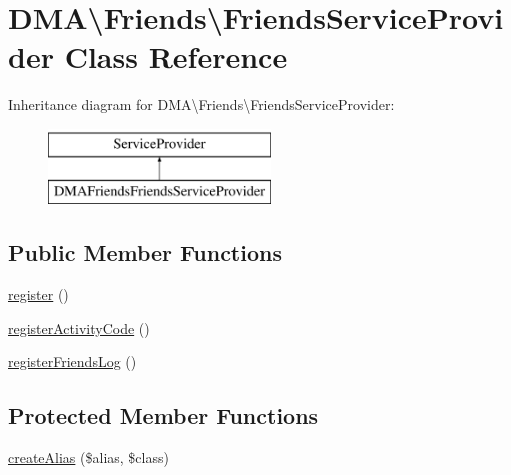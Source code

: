 \hypertarget{classDMA_1_1Friends_1_1FriendsServiceProvider}{\section{D\+M\+A\textbackslash{}Friends\textbackslash{}Friends\+Service\+Provider Class Reference}
\label{classDMA_1_1Friends_1_1FriendsServiceProvider}
}
Inheritance diagram for D\+M\+A\textbackslash{}Friends\textbackslash{}Friends\+Service\+Provider\+:\begin{figure}[H]
\begin{center}
\leavevmode
\includegraphics[height=2.000000cm]{df/d6d/classDMA_1_1Friends_1_1FriendsServiceProvider}
\end{center}
\end{figure}
\subsection*{Public Member Functions}
\begin{DoxyCompactItemize}
\item 
\hyperlink{classDMA_1_1Friends_1_1FriendsServiceProvider_a6a90d2cdc4c6b153b45764ba66e154ae}{register} ()
\item 
\hyperlink{classDMA_1_1Friends_1_1FriendsServiceProvider_aa21a040ba3b9fd8ef5cabaa63ccc10f8}{register\+Activity\+Code} ()
\item 
\hyperlink{classDMA_1_1Friends_1_1FriendsServiceProvider_a2d6ff7101ca6389c00e298f2d594a1df}{register\+Friends\+Log} ()
\end{DoxyCompactItemize}
\subsection*{Protected Member Functions}
\begin{DoxyCompactItemize}
\item 
\hyperlink{classDMA_1_1Friends_1_1FriendsServiceProvider_acad52dc5020c640afed3c4fe82243051}{create\+Alias} (\$alias, \$class)
\end{DoxyCompactItemize}


